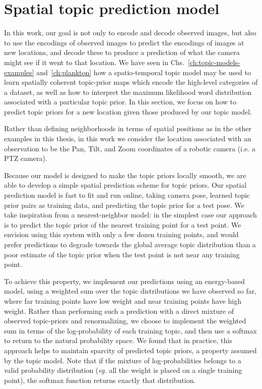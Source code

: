 \section{Spatial topic prediction model} \label{sec:spatial-prediction-spatial-model}
In this work, our goal is not only to encode and decode observed images, but also to use the encodings of observed images to predict the encodings of images at new locations, and decode these to produce a prediction of what the camera might see if it went to that location. We have seen in Chs.~\ref{ch:topic-models-examples} and~\ref{ch:plankton} how a spatio-temporal topic model may be used to learn spatially coherent topic-prior maps which encode the high-level categories of a dataset, as well as how to interpret the maximum likelihood word distribution associated with a particular topic prior. In this section, we focus on how to predict topic priors for a new location given those produced by our topic model.

Rather than defining neighborhoods in terms of spatial positions as in the other examples in this thesis, in this work we consider the location associated with an observation to be the Pan, Tilt, and Zoom coordinates of a robotic camera (i.e. a PTZ camera).

Because our model is designed to make the topic priors locally smooth, we are able to develop a simple spatial prediction scheme for topic priors. Our spatial prediction model is fast to fit and run online, taking camera pose, learned topic prior pairs as training data, and predicting the topic prior for a test pose. We take inspiration from a nearest-neighbor model: in the simplest case our approach is to predict the topic prior of the nearest training point for a test point. We envision using this system with only a few dozen training points, and would prefer predictions to degrade towards the global average topic distribution than a poor estimate of the topic prior when the test point is not near any training point.

To achieve this property, we implement our predictions using an energy-based model, using a weighted sum over the topic distributions we have observed so far, where far training points have low weight and near training points have high weight. Rather than performing such a prediction with a direct mixture of observed topic-priors and renormalizing, we choose to implement the weighted sum in terms of the log-probability of each training topic, and then use a softmax to return to the natural probability space. We found that in practice, this approach helps to maintain sparcity of predicted topic priors, a property assumed by the topic model. Note that if the mixture of log-probabilities belongs to a valid probability distribution (\emph{eg.} all the weight is placed on a single training point), the softmax function returns exactly that distribution.


